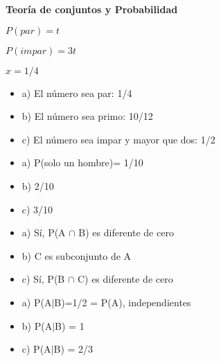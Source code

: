 \documentclass{../oxmathproblems}
\begin{document}
\begin{questions}

\miquestion \textbf{Teoría de conjuntos y Probabilidad}


$ P(par) = t $

$ P(impar) = 3t $

$ x = 1/4 $

\begin{itemize}

\item a) El número sea par: 1/4

\item b) El número sea primo:
 10/12  

\item c) El número sea impar y mayor que dos: 1/2

\end{itemize}



\miquestion
\begin{itemize}

\item a) P(solo un hombre)= 1/10 

\item b) 2/10
\item c) 3/10
\end{itemize}


\miquestion 
\begin{itemize}

\item a) Sí, P(A $\cap$ B) es diferente de cero 
\item b) C es subconjunto de A 
\item c) Sí, P(B $\cap$ C) es diferente de cero 
\end{itemize}

\miquestion

\begin{itemize}

\item a) P(A$\mid$B)=1/2 = P(A), independientes 
\item b) P(A$\mid$B) = 1 

\item c) P(A$\mid$B) = 2/3  
\end{itemize}

\miquestion 

\begin{itemize}


\end{itemize}
\end{questions}
\end{document}
